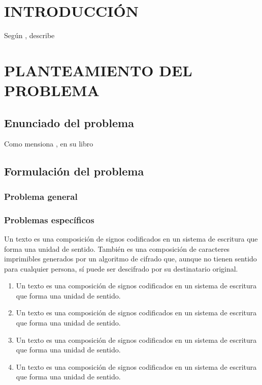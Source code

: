 \documentclass[12pt,a4paper]{article} %
\begin{document}
	\section*{INTRODUCCIÓN}
		\lipsum[1-3]
		Según \cite{Schmidt-2020}, describe
		\lipsum[4]
	\newpage
	\section{PLANTEAMIENTO DEL PROBLEMA}
		\subsection{Enunciado del problema}
			\lipsum[4]
			Como mensiona \cite{Koop-2003}, en su libro
			\lipsum[5]
		\subsection{Formulación del problema}
			\lipsum[5]
			\subsubsection{Problema general}
				\lipsum[6]
			\subsubsection{Problemas específicos}
				\lipsum[1]
				Un texto es una composición de signos codificados en un sistema
				de escritura que forma una unidad de sentido. También es una composición
				de caracteres imprimibles generados por un algoritmo de cifrado que, aunque no
				tienen sentido para cualquier persona, sí puede ser descifrado por su destinatario original.
				\begin{enumerate}
					\item Un texto es una composición de signos codificados en un sistema
					de escritura que forma una unidad de sentido.
					\item Un texto es una composición de signos codificados en un sistema
					de escritura que forma una unidad de sentido.
					\item Un texto es una composición de signos codificados en un sistema
					de escritura que forma una unidad de sentido.
					\item Un texto es una composición de signos codificados en un sistema
					de escritura que forma una unidad de sentido.
				\end{enumerate}
	\newpage
\end{document}
